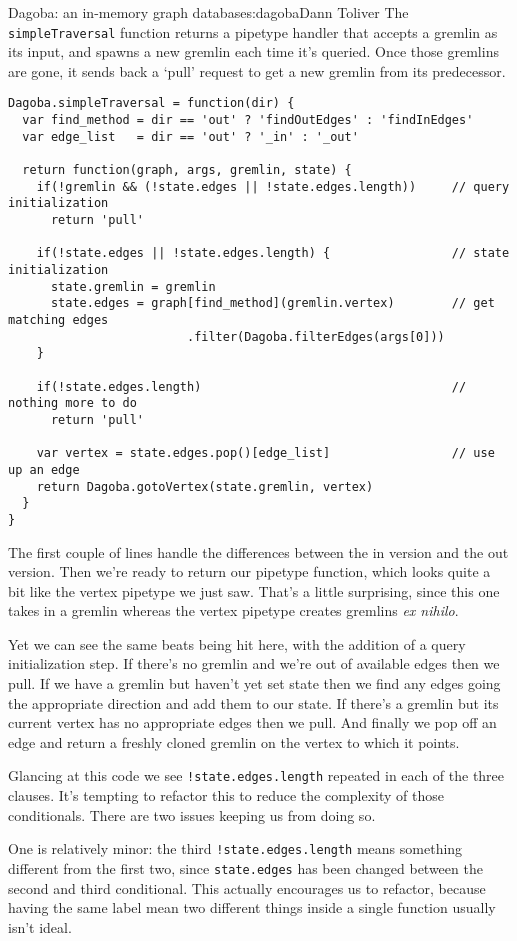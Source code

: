 \begin{aosachapter}{Dagoba: an in-memory graph database}{s:dagoba}{Dann Toliver}
The \texttt{simpleTraversal} function returns a pipetype handler that
accepts a gremlin as its input, and spawns a new gremlin each time it's
queried. Once those gremlins are gone, it sends back a `pull' request to
get a new gremlin from its predecessor.

\begin{verbatim}
Dagoba.simpleTraversal = function(dir) {
  var find_method = dir == 'out' ? 'findOutEdges' : 'findInEdges'
  var edge_list   = dir == 'out' ? '_in' : '_out'

  return function(graph, args, gremlin, state) {
    if(!gremlin && (!state.edges || !state.edges.length))     // query initialization
      return 'pull'

    if(!state.edges || !state.edges.length) {                 // state initialization
      state.gremlin = gremlin
      state.edges = graph[find_method](gremlin.vertex)        // get matching edges
                         .filter(Dagoba.filterEdges(args[0]))
    }

    if(!state.edges.length)                                   // nothing more to do
      return 'pull'

    var vertex = state.edges.pop()[edge_list]                 // use up an edge
    return Dagoba.gotoVertex(state.gremlin, vertex)
  }
}
\end{verbatim}

The first couple of lines handle the differences between the in version
and the out version. Then we're ready to return our pipetype function,
which looks quite a bit like the vertex pipetype we just saw. That's a
little surprising, since this one takes in a gremlin whereas the vertex
pipetype creates gremlins \emph{ex nihilo}.

Yet we can see the same beats being hit here, with the addition of a
query initialization step. If there's no gremlin and we're out of
available edges then we pull. If we have a gremlin but haven't yet set
state then we find any edges going the appropriate direction and add
them to our state. If there's a gremlin but its current vertex has no
appropriate edges then we pull. And finally we pop off an edge and
return a freshly cloned gremlin on the vertex to which it points.

Glancing at this code we see \texttt{!state.edges.length} repeated in
each of the three clauses. It's tempting to refactor this to reduce the
complexity of those conditionals. There are two issues keeping us from
doing so.

One is relatively minor: the third \texttt{!state.edges.length} means
something different from the first two, since \texttt{state.edges} has
been changed between the second and third conditional. This actually
encourages us to refactor, because having the same label mean two
different things inside a single function usually isn't ideal.


\end{aosachapter}
